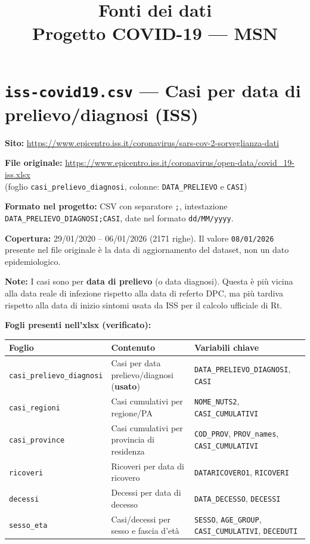 \documentclass[12pt, a4paper]{article}
\title{\textbf{Fonti dei dati}\\[0.3em]
       \large Progetto COVID-19 — MSN}
\author{}
\date{}
\begin{document}
\maketitle
\tableofcontents
\newpage

\section{\texttt{iss-covid19.csv} — Casi per data di prelievo/diagnosi (ISS)}

\textbf{Sito:}
\url{https://www.epicentro.iss.it/coronavirus/sars-cov-2-sorveglianza-dati}

\textbf{File originale:}
\url{https://www.epicentro.iss.it/coronavirus/open-data/covid_19-iss.xlsx}\\
(foglio \texttt{casi\_prelievo\_diagnosi}, colonne: \texttt{DATA\_PRELIEVO} e \texttt{CASI})

\textbf{Formato nel progetto:} CSV con separatore \texttt{;}, intestazione
\texttt{DATA\_PRELIEVO\_DIAGNOSI;CASI}, date nel formato \texttt{dd/MM/yyyy}.

\textbf{Copertura:} 29/01/2020 – 06/01/2026 (2171 righe). Il valore
\texttt{08/01/2026} presente nel file originale è la data di aggiornamento del
dataset, non un dato epidemiologico.

\textbf{Note:} I casi sono per \textbf{data di prelievo} (o data diagnosi).
Questa è più vicina alla data reale di infezione rispetto alla data di referto
DPC, ma più tardiva rispetto alla data di inizio sintomi usata da ISS per il
calcolo ufficiale di Rt.

\textbf{Fogli presenti nell'xlsx (verificato):}

\begin{table}[h!]
\small
\begin{tabular}{@{} L{3.8cm} L{5.0cm} L{5.0cm} @{}}
\toprule
\textbf{Foglio} & \textbf{Contenuto} & \textbf{Variabili chiave} \\
\midrule
\texttt{casi\_prelievo\_diagnosi}
    & Casi per data prelievo/diagnosi (\textbf{usato})
    & \texttt{DATA\_PRELIEVO\_DIAGNOSI}, \texttt{CASI} \\[4pt]
\texttt{casi\_regioni}
    & Casi cumulativi per regione/PA
    & \texttt{NOME\_NUTS2}, \texttt{CASI\_CUMULATIVI} \\[4pt]
\texttt{casi\_province}
    & Casi cumulativi per provincia di residenza
    & \texttt{COD\_PROV}, \texttt{PROV\_names},
      \texttt{CASI\_CUMULATIVI} \\[4pt]
\texttt{ricoveri}
    & Ricoveri per data di ricovero
    & \texttt{DATARICOVERO1}, \texttt{RICOVERI} \\[4pt]
\texttt{decessi}
    & Decessi per data di decesso
    & \texttt{DATA\_DECESSO}, \texttt{DECESSI} \\[4pt]
\texttt{sesso\_eta}
    & Casi/decessi per sesso e fascia d'età
    & \texttt{SESSO}, \texttt{AGE\_GROUP},
      \texttt{CASI\_CUMULATIVI}, \texttt{DECEDUTI} \\
\bottomrule
\end{tabular}
\end{table}
\end{document}
